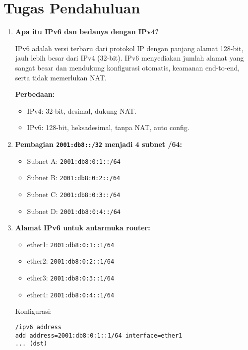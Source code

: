\section{Tugas Pendahuluan}
\begin{enumerate}
    \item \textbf{Apa itu IPv6 dan bedanya dengan IPv4?}

    IPv6 adalah versi terbaru dari protokol IP dengan panjang alamat 128-bit, jauh lebih besar dari IPv4 (32-bit). IPv6 menyediakan jumlah alamat yang sangat besar dan mendukung konfigurasi otomatis, keamanan end-to-end, serta tidak memerlukan NAT.

    \textbf{Perbedaan:}
    \begin{itemize}
        \item IPv4: 32-bit, desimal, dukung NAT.
        \item IPv6: 128-bit, heksadesimal, tanpa NAT, auto config.
    \end{itemize}

    \item \textbf{Pembagian \texttt{2001:db8::/32} menjadi 4 subnet /64:}
    
    \begin{itemize}
        \item Subnet A: \texttt{2001:db8:0:1::/64}
        \item Subnet B: \texttt{2001:db8:0:2::/64}
        \item Subnet C: \texttt{2001:db8:0:3::/64}
        \item Subnet D: \texttt{2001:db8:0:4::/64}
    \end{itemize}

    \item \textbf{Alamat IPv6 untuk antarmuka router:}

    \begin{itemize}
        \item ether1: \texttt{2001:db8:0:1::1/64}
        \item ether2: \texttt{2001:db8:0:2::1/64}
        \item ether3: \texttt{2001:db8:0:3::1/64}
        \item ether4: \texttt{2001:db8:0:4::1/64}
    \end{itemize}

    Konfigurasi:
    \begin{verbatim}
/ipv6 address
add address=2001:db8:0:1::1/64 interface=ether1
... (dst)
    \end{verbatim}


\end{enumerate}
